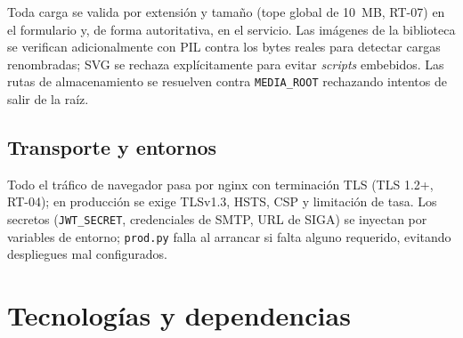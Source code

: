 \documentclass[12pt,letterpaper]{report}
\begin{document}
Toda carga se valida por extensión y tamaño (tope global de 10~MB, RT-07) en el
formulario y, de forma autoritativa, en el servicio. Las imágenes de la
biblioteca se verifican adicionalmente con PIL contra los bytes reales para
detectar cargas renombradas; SVG se rechaza explícitamente para evitar
\textit{scripts} embebidos. Las rutas de almacenamiento se resuelven contra
\texttt{MEDIA\_ROOT} rechazando intentos de salir de la raíz.

\section{Transporte y entornos}

Todo el tráfico de navegador pasa por nginx con terminación TLS (TLS 1.2+,
RT-04); en producción se exige TLSv1.3, HSTS, CSP y limitación de tasa. Los
secretos (\texttt{JWT\_SECRET}, credenciales de SMTP, URL de SIGA) se inyectan por
variables de entorno; \texttt{prod.py} falla al arrancar si falta alguno
requerido, evitando despliegues mal configurados.

\chapter{Tecnologías y dependencias}
\end{document}
